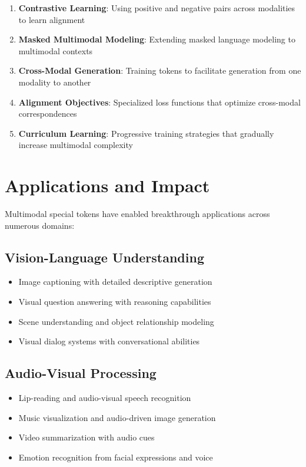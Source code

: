 \begin{enumerate}
\item \textbf{Contrastive Learning}: Using positive and negative pairs across modalities to learn alignment \citep{radford2021learning, chen2020simple}
\item \textbf{Masked Multimodal Modeling}: Extending masked language modeling to multimodal contexts \citep{wang2022image, he2022masked}
\item \textbf{Cross-Modal Generation}: Training tokens to facilitate generation from one modality to another \citep{ramesh2022hierarchical, saharia2022photorealistic}
\item \textbf{Alignment Objectives}: Specialized loss functions that optimize cross-modal correspondences \citep{li2022blip, mokady2022clipcap}
\item \textbf{Curriculum Learning}: Progressive training strategies that gradually increase multimodal complexity \citep{alayrac2022flamingo}
\end{enumerate}

\section{Applications and Impact}

Multimodal special tokens have enabled breakthrough applications across numerous domains:

\subsection{Vision-Language Understanding}
\begin{itemize}
\item Image captioning with detailed descriptive generation \citep{li2022blip, mokady2022clipcap}
\item Visual question answering with reasoning capabilities \citep{liu2023visual, li2023blip2}
\item Scene understanding and object relationship modeling \citep{lu2019vilbert, tan2019lxmert}
\item Visual dialog systems with conversational abilities \citep{alayrac2022flamingo}
\end{itemize}

\subsection{Audio-Visual Processing}
\begin{itemize}
\item Lip-reading and audio-visual speech recognition \citep{akbari2021vatt}
\item Music visualization and audio-driven image generation \citep{huang2023audiogpt}
\item Video summarization with audio cues \citep{zellers2021merlot, zhang2023video}
\item Emotion recognition from facial expressions and voice \citep{girdhar2023imagebind}
\end{itemize}

